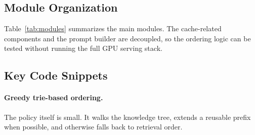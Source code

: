 \documentclass{article}
\begin{document}
\subsection{Module Organization}

Table~\ref{tab:modules} summarizes the main modules. The cache-related components and the prompt builder are decoupled, so the ordering logic can be tested without running the full GPU serving stack.

\begin{table}[h]
\caption{Core-library modules (excludes benchmark scripts, workload generators, and evaluation harnesses). Cache subsystem and integration layer are decoupled: the trie + prompt builder can run without GPU for unit tests.}
\label{tab:modules}
\centering
\scriptsize
{}
\vspace{-0.5em}
\end{table}

\subsection{Key Code Snippets}

\paragraph{Greedy trie-based ordering.} The policy itself is small. It walks the knowledge tree, extends a reusable prefix when possible, and otherwise falls back to retrieval order.
\end{document}
